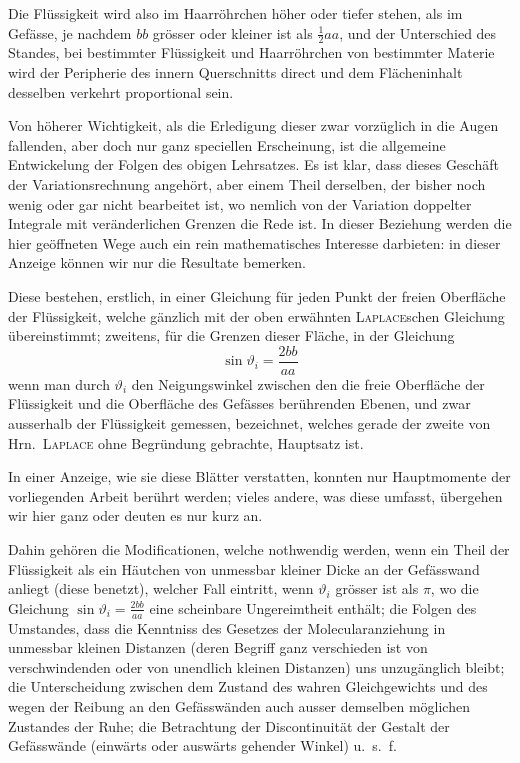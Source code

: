 \documentclass[12pt,a4paper]{article}
\begin{document}
Die Flüssigkeit wird also im Haarröhrchen höher oder tiefer stehen, als im Gefässe, je nachdem $\mathit{bb}$ grösser oder kleiner ist als $\tfrac{1}{2}aa$, und der Unterschied des Standes, bei bestimmter Flüssigkeit und Haarröhrchen von bestimmter Materie wird der Peripherie des innern Querschnitts direct und dem Flächeninhalt desselben verkehrt proportional sein.

\bigskip

Von höherer Wichtigkeit, als die Erledigung dieser zwar vorzüglich in die Augen fallenden, aber doch nur ganz speciellen Erscheinung, ist die allgemeine Entwickelung der Folgen des obigen Lehrsatzes. Es ist klar, dass dieses Geschäft der Variationsrechnung angehört, aber einem Theil derselben, der bisher noch wenig oder gar nicht bearbeitet ist, wo nemlich von der Variation doppelter Integrale mit veränderlichen Grenzen die Rede ist. In dieser Beziehung werden die hier geöffneten Wege auch ein rein mathematisches Interesse darbieten: in dieser Anzeige können wir nur die Resultate bemerken.

Diese bestehen, erstlich, in einer Gleichung für jeden Punkt der freien Oberfläche der Flüssigkeit, welche gänzlich mit der oben erwähnten \textsc{Laplace}schen Gleichung übereinstimmt; zweitens, für die Grenzen dieser Fläche, in der Gleichung
\begin{equation*}
    \sin\vartheta_i = \frac{2\mathit{bb}}{aa}
\end{equation*}
wenn man durch $\vartheta_i$ den Neigungswinkel zwischen den die freie Oberfläche der Flüssigkeit und die Oberfläche des Gefässes berührenden Ebenen, und zwar ausserhalb der Flüssigkeit gemessen, bezeichnet, welches gerade der zweite von Hrn.~\textsc{Laplace} ohne Begründung gebrachte, Hauptsatz ist.

\bigskip

In einer Anzeige, wie sie diese Blätter verstatten, konnten nur Hauptmomente der vorliegenden Arbeit berührt werden; vieles andere, was diese umfasst, übergehen wir hier ganz oder deuten es nur kurz an.

Dahin gehören die Modificationen, welche nothwendig werden, wenn ein Theil der Flüssigkeit als ein Häutchen von unmessbar kleiner Dicke an der Gefässwand anliegt (diese benetzt), welcher Fall eintritt, wenn $\vartheta_i$ grösser ist als $\pi$, wo die Gleichung $\sin\vartheta_i = \frac{2\mathit{bb}}{aa}$ eine scheinbare Ungereimtheit enthält; die Folgen des Umstandes, dass die Kenntniss des Gesetzes der Molecularanziehung in unmessbar kleinen Distanzen (deren Begriff ganz verschieden ist von verschwindenden oder von unendlich kleinen Distanzen) uns unzugänglich bleibt; die Unterscheidung zwischen dem Zustand des wahren Gleichgewichts und des wegen der Reibung an den Gefässwänden auch ausser demselben möglichen Zustandes der Ruhe; die Betrachtung der Discontinuität der Gestalt der Gefässwände (einwärts oder auswärts gehender Winkel) u.~s.~f.
\end{document}
